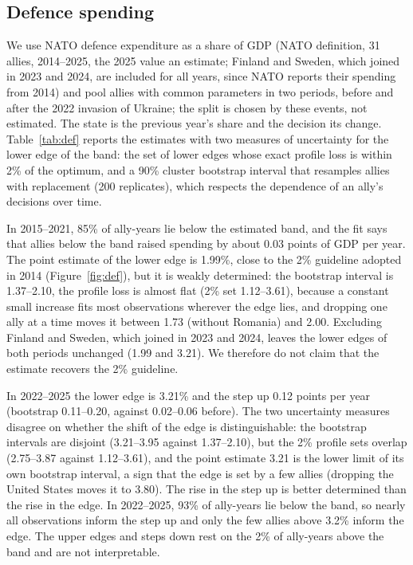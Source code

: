 \documentclass[11pt,a4paper]{article}
\theoremstyle{remark}\newtheorem{remark}{Remark}
\begin{document}
\subsection{Defence spending}\label{sec:def}
We use NATO defence expenditure as a share of GDP (NATO definition, 31 allies, 2014--2025, the 2025 value an estimate; Finland and Sweden, which joined in 2023 and 2024, are included for all years, since NATO reports their spending from 2014) and pool allies with common parameters in two periods, before and after the 2022 invasion of Ukraine; the split is chosen by these events, not estimated. The state is the previous year's share and the decision its change. Table~\ref{tab:def} reports the estimates with two measures of uncertainty for the lower edge of the band: the set of lower edges whose exact profile loss is within 2\% of the optimum, and a 90\% cluster bootstrap interval that resamples allies with replacement (200 replicates), which respects the dependence of an ally's decisions over time.

In 2015--2021, 85\% of ally-years lie below the estimated band, and the fit says that allies below the band raised spending by about 0.03 points of GDP per year. The point estimate of the lower edge is 1.99\%, close to the 2\% guideline adopted in 2014 (Figure~\ref{fig:def}), but it is weakly determined: the bootstrap interval is 1.37--2.10, the profile loss is almost flat (2\% set 1.12--3.61), because a constant small increase fits most observations wherever the edge lies, and dropping one ally at a time moves it between 1.73 (without Romania) and 2.00. Excluding Finland and Sweden, which joined in 2023 and 2024, leaves the lower edges of both periods unchanged (1.99 and 3.21). We therefore do not claim that the estimate recovers the 2\% guideline.

In 2022--2025 the lower edge is 3.21\% and the step up 0.12 points per year (bootstrap 0.11--0.20, against 0.02--0.06 before). The two uncertainty measures disagree on whether the shift of the edge is distinguishable: the bootstrap intervals are disjoint (3.21--3.95 against 1.37--2.10), but the 2\% profile sets overlap (2.75--3.87 against 1.12--3.61), and the point estimate 3.21 is the lower limit of its own bootstrap interval, a sign that the edge is set by a few allies (dropping the United States moves it to 3.80). The rise in the step up is better determined than the rise in the edge. In 2022--2025, 93\% of ally-years lie below the band, so nearly all observations inform the step up and only the few allies above 3.2\% inform the edge. The upper edges and steps down rest on the 2\% of ally-years above the band and are not interpretable.
\end{document}
